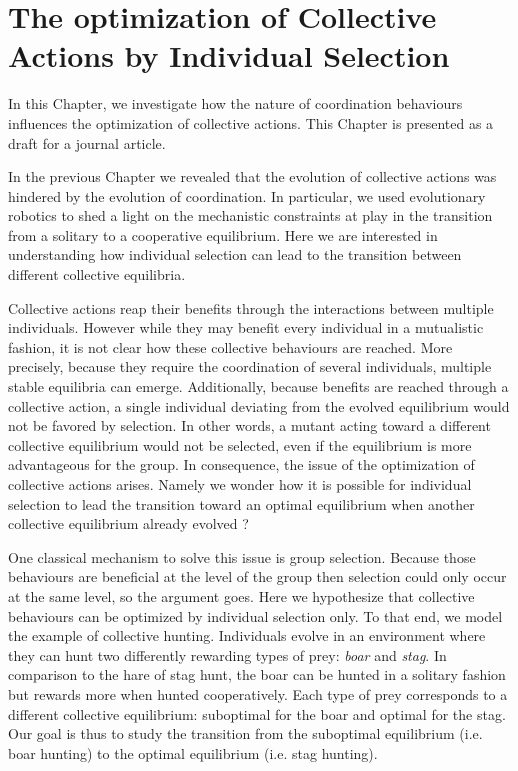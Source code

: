 \chapter{The optimization of Collective Actions by Individual Selection}
\label{chapter:C1_article2}

\setcounter{secnumdepth}{0}
\setcounter{minitocdepth}{1}
\minitoc[n] %

In this Chapter, we investigate how the nature of coordination behaviours influences the optimization of collective actions. This Chapter is presented as a draft for a journal article.

In the previous Chapter we revealed that the evolution of collective actions was hindered by the evolution of coordination. In particular, we used evolutionary robotics to shed a light on the mechanistic constraints at play in the transition from a solitary to a cooperative equilibrium. Here we are interested in understanding how individual selection can lead to the transition between different collective equilibria.

Collective actions reap their benefits through the interactions between multiple individuals. However while they may benefit every individual in a mutualistic fashion, it is not clear how these collective behaviours are reached. More precisely, because they require the coordination of several individuals, multiple stable equilibria can emerge. Additionally, because benefits are reached through a collective action, a single individual deviating from the evolved equilibrium would not be favored by selection. In other words, a mutant acting toward a different collective equilibrium would not be selected, even if the equilibrium is more advantageous for the group. In consequence, the issue of the optimization of collective actions arises. Namely we wonder how it is possible for individual selection to lead the transition toward an optimal equilibrium when another collective equilibrium already evolved ?

One classical mechanism to solve this issue is group selection. Because those behaviours are beneficial at the level of the group then selection could only occur at the same level, so the argument goes. Here we hypothesize that collective behaviours can be optimized by individual selection only. To that end, we model the example of collective hunting. Individuals evolve in an environment where they can hunt two differently rewarding types of prey: \emph{boar} and \emph{stag}. In comparison to the hare of stag hunt, the boar can be hunted in a solitary fashion but rewards more when hunted cooperatively. Each type of prey corresponds to a different collective equilibrium: suboptimal for the boar and optimal for the stag. Our goal is thus to study the transition from the suboptimal equilibrium (i.e. boar hunting) to the optimal equilibrium (i.e. stag hunting).

